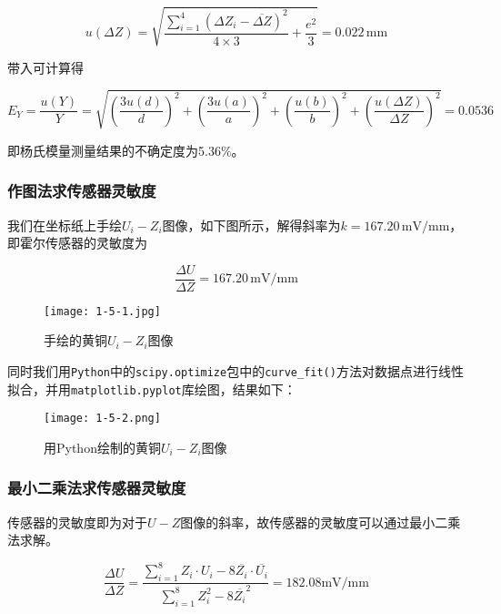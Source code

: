 \documentclass[12pt]{article}
\begin{document}
\[
    u(\Delta Z)=\sqrt{\frac{\sum_{i=1}^{4}(\Delta Z_i-\overline{\Delta Z})^2}{4\times3}+\frac{e^2}{3}}=0.022\,\mathrm{mm}
\]

带入可计算得

\[
    E_Y=\frac{u(Y)}{Y}=\sqrt{\left(\frac{3u(d)}{d}\right)^2+\left(\frac{3u(a)}{a}\right)^2+\left(\frac{u(b)}{b}\right)^2+\left(\frac{u(\Delta Z)}{\Delta Z}\right)^2}=0.0536
\]

即杨氏模量测量结果的不确定度为5.36\%。

\subsubsection{作图法求传感器灵敏度}

我们在坐标纸上手绘$U_i-Z_i$图像，如下图所示，解得斜率为$k=167.20\,\mathrm{mV/mm}$，即霍尔传感器的灵敏度为

\[
    \frac{\Delta U}{\Delta Z}=167.20\,\mathrm{mV/mm}
\]

\begin{figure}[htbp]
    \centering
    \texttt{[image: 1-5-1.jpg]}
    \caption{手绘的黄铜$U_i-Z_i$图像}
\end{figure}

同时我们用\verb|Python|中的\verb|scipy.optimize|包中的\verb|curve_fit()|方法对数据点进行线性拟合，并用\verb|matplotlib.pyplot|库绘图，结果如下：

\begin{figure}[htbp]
    \centering
    \texttt{[image: 1-5-2.png]}
    \caption{用Python绘制的黄铜$U_i-Z_i$图像}
\end{figure}

\subsubsection{最小二乘法求传感器灵敏度}
传感器的灵敏度即为对于$U-Z$图像的斜率，故传感器的灵敏度可以通过最小二乘法求解。

\[
    \frac{\Delta U}{\Delta Z}=\dfrac{\sum_{i=1}^{8}Z_i \cdot U_i-8\overline{Z_i}\cdot\overline{U_i}}{\sum_{i=1}^{8}Z_i^2-8\overline{Z_i}^2}=182.08\mathrm{mV/mm}
\]
\end{document}

